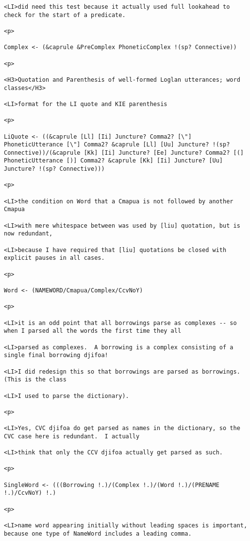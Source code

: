 \documentclass[12pt]{article}
\begin{document}
\begin{lstlisting}
<LI>did need this test because it actually used full lookahead to check for the start of a predicate.

<p>

Complex <- (&caprule &PreComplex PhoneticComplex !(sp? Connective))

<p>

<H3>Quotation and Parenthesis of well-formed Loglan utterances; word classes</H3>

<LI>format for the LI quote and KIE parenthesis

<p>

LiQuote <- ((&caprule [Ll] [Ii] Juncture? Comma2? [\"] PhoneticUtterance [\"] Comma2? &caprule [Ll] [Uu] Juncture? !(sp? Connective))/(&caprule [Kk] [Ii] Juncture? [Ee] Juncture? Comma2? [(] PhoneticUtterance [)] Comma2? &caprule [Kk] [Ii] Juncture? [Uu] Juncture? !(sp? Connective)))

<p>

<LI>the condition on Word that a Cmapua is not followed by another Cmapua

<LI>with mere whitespace between was used by [liu] quotation, but is now redundant,

<LI>because I have required that [liu] quotations be closed with explicit pauses in all cases.

<p>

Word <- (NAMEWORD/Cmapua/Complex/CcvNoY)

<p>

<LI>it is an odd point that all borrowings parse as complexes -- so when I parsed all the words the first time they all

<LI>parsed as complexes.  A borrowing is a complex consisting of a single final borrowing djifoa!

<LI>I did redesign this so that borrowings are parsed as borrowings.  (This is the class

<LI>I used to parse the dictionary).

<p>

<LI>Yes, CVC djifoa do get parsed as names in the dictionary, so the CVC case here is redundant.  I actually

<LI>think that only the CCV djifoa actually get parsed as such.

<p>

SingleWord <- (((Borrowing !.)/(Complex !.)/(Word !.)/(PRENAME !.)/CcvNoY) !.)

<p>

<LI>name word appearing initially without leading spaces is important, because one type of NameWord includes a leading comma.


\end{lstlisting}
\end{document}
